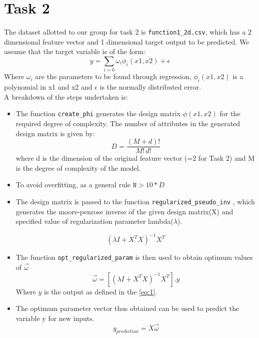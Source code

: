 \documentclass[12pt,a4paper]{article}
\def\tt#1{\texttt{#1}}
\begin{document}
\section{Task 2}
The dataset allotted to our group for task 2 is \tt{function1\_2d.csv}, which has a 2 dimensional feature vector and 1 dimensional target output to be predicted. We assume that the target variable is of the form:
\begin{equation}\label{eq:1}
    y=\sum_{i=0}\omega _{i}\phi_{i}(x1,x2)  +\epsilon 
\end{equation}
Where $\omega_{i}$ are the parameters to be found through regression, $\phi_{i}(x1,x2)$ is a polynomial in x1 and x2 and $\epsilon$ is the normally distributed error. 
\\ A breakdown of the steps undertaken is:

\begin{itemize}
    \itemsep0em
    \item The function \tt{create\_phi} generates the design matrix $\phi(x1,x2)$ for the required degree of complexity.
    The number of attributes in the generated design matrix is given by:
    \begin{equation}
        D=\frac{(M+d)!}{M!\,d!}
    \end{equation}
    where d is the dimension of the original feature vector (=2 for Task 2) and M is the degree of complexity of the model.
    \item To avoid overfitting, as a general rule $\tt{N}>10*D$
    \item The design matrix is passed to the function \tt{regularized\_pseudo\_inv} , which generates the moore-penrose inverse of the given design matrix(X) and specified value of regularization parameter lambda($\lambda$).
    
    \begin{equation}
         (\lambda I+X^{T}X)^{-1}X^{T}
    \end{equation}
    
    \item The function \tt{opt\_regularized\_param} is then used to obtain optimum values of $\vec{\omega}$
    \begin{equation}
        \vec{\omega} = [(\lambda I+X^{T}X)^{-1}X^{T}].y
    \end{equation}
    Where $y$ is the output as defined in the \autoref{eq:1}.
    
    \item The optimum parameter vector thus obtained can be used to predict the variable y for new inputs. 
    \begin{equation}
        y_{prediction}=X\vec{\omega}
    \end{equation}
\end{itemize}
\end{document}
